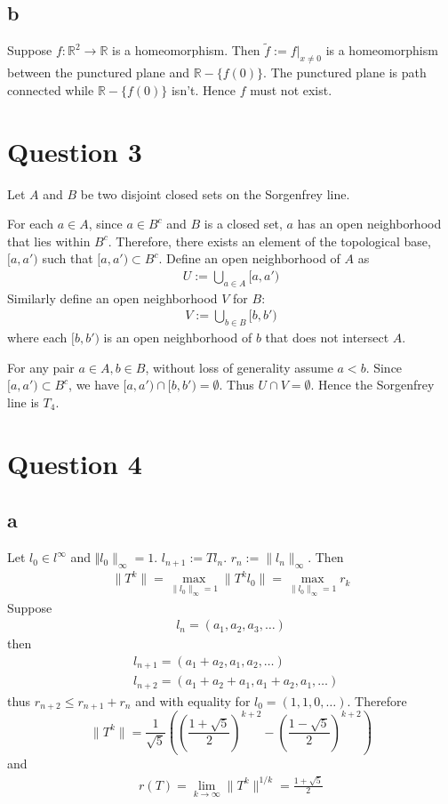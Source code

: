 \documentclass{article}
\begin{document}
\subsection*{b}
Suppose $f:\mathbb{R}^2\to \mathbb{R}$ is a homeomorphism. Then $\tilde{f}:=f|_{x\neq 0}$ is a homeomorphism between the punctured plane and $\mathbb{R}-\{f(0)\}$. The punctured plane is path connected while $\mathbb{R}-\{f(0)\}$ isn't. Hence $f$ must not exist.




\section*{Question 3}


Let $A$ and $B$ be two disjoint closed sets on the Sorgenfrey line. 

For each $a\in A$, since $a\in B^c$ and $B$ is a closed set, $a$ has an open neighborhood that lies within $B^c$. Therefore, there exists an element of the topological base, $[a,a')$ such that $[a,a')\subset B^c$. Define an open neighborhood of $A$ as
\begin{align*}
	U:=\bigcup_{a\in A}[a,a') 
	\end{align*}
Similarly define an open neighborhood $V$ for $B$:
\begin{align*}
	V:=\bigcup_{b\in B}[b,b')
\end{align*}
where each $[b,b')$ is an open neighborhood of $b$ that does not intersect $A$.

For any pair $a\in A, b\in B$, without loss of generality assume $a<b$. 
Since $[a,a') \subset B^c$, we have $[a,a')\cap [b,b')=\emptyset$. Thus $U\cap V=\emptyset$. Hence the Sorgenfrey line is $T_4$.




\section*{Question 4}
\subsection*{a}
Let $l_0\in l^\infty$ and $\Vert l_0 \rVert_\infty=1$. $l_{n+1}:=Tl_n$. $r_n:=\lVert l_n\rVert_\infty$. Then
\begin{align*}
	\lVert T^k  \rVert = \max_{\lVert l_0\rVert_\infty=1}\lVert T^k l_0 \rVert = \max_{\lVert l_0 \rVert_\infty=1}r_k
\end{align*}
Suppose 
\begin{align*}
	l_n=(a_1,a_2,a_3,\dots) 
\end{align*}
then
\begin{align*}
	&l_{n+1}=(a_1+a_2,a_1,a_2,\dots) \\
	&l_{n+2}=(a_1+a_2+a_1,a_1+a_2,a_1,\dots)
\end{align*}
thus $r_{n+2}\leq r_{n+1}+r_n$ and with equality for $l_0=(1,1,0,\dots)$.
Therefore $$\lVert T^k \rVert=\frac{1}{\sqrt{5}}((\frac{1+\sqrt{5}}{2} )^{k+2}-(\frac{1-\sqrt{5}}{2})^{k+2} )$$
and
\begin{align*}
	r(T)=\lim_{k\to\infty} \lVert T^k\rVert^{1/k}=\frac{1+\sqrt{5}}{2}
\end{align*}
\end{document}
